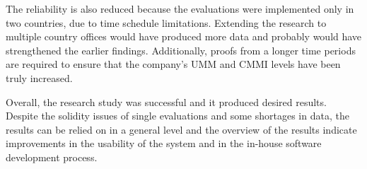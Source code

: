 \documentclass[12pt,a4paper,oneside,pdftex]{report}
\begin{document}
The reliability is also reduced because the evaluations were implemented only in two countries, due to time schedule limitations. Extending the research to multiple country offices would have produced more data and probably would have strengthened the earlier findings. Additionally, proofs from a longer time periods are required to ensure that the company's UMM and CMMI levels have been truly increased.


Overall, the research study was successful and it produced desired results. Despite the solidity issues of single evaluations and some shortages in data, the results can be relied on in a general level and the overview of the results indicate improvements in the usability of the system and in the in-house software development process.


\end{document}
